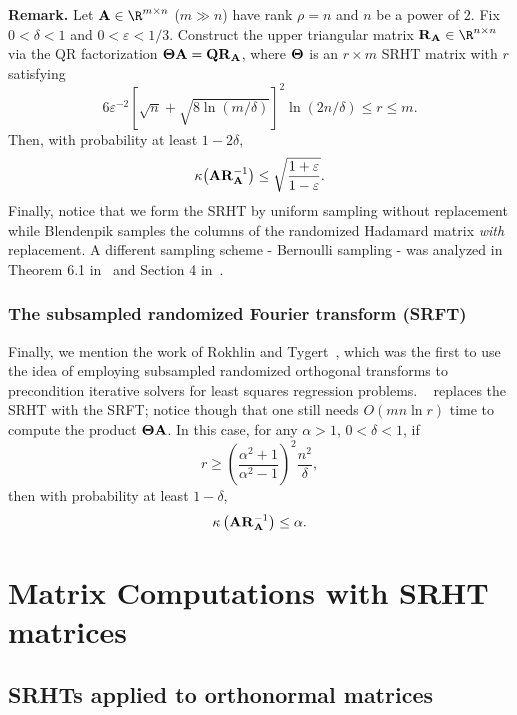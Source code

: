 { \bf Remark.}
Let $\matA \in \R^{m \times n}$ ($m \gg n$) have rank $\rho=n$ and $n$ be a power of $2$. Fix $0 < \delta < 1$ and $0 < \varepsilon < 1/3$.
Construct the upper triangular matrix $\matR_{\matA} \in \R^{n \times n}$ via the QR factorization ${\bm{\mathrm{\Theta}}} {\bm{\mathrm{A}}} = {\bm{\mathrm{Q}}} {\bm{\mathrm{R}}}_{{\bm{\mathrm{A}}}}$,
where ${\bm{\mathrm{\Theta}}}$ is an $r \times m$ SRHT matrix with
$r$ satisfying
\[
 6 \varepsilon^{-2} \left[\sqrt{n} + \sqrt{8\ln(m/\delta)} \right]^2 \ln(2n/\delta) \leq r \leq m.
\]
Then, with probability at least $1 -  2 \delta$,
$$\kappa{ \left( {\ensuremath{\bm{\mathrm{A}}}}{\ensuremath{\bm{\mathrm{R}}}}_{{\ensuremath{\bm{\mathrm{A}}}}}^{-1} \right) } \le \sqrt{ {1 +\varepsilon\over 1 - \varepsilon}}.$$
Finally, notice that we form the SRHT by uniform sampling without replacement while Blendenpik samples the columns of the randomized Hadamard matrix \emph{with} replacement.
A different sampling scheme - Bernoulli sampling - was analyzed in Theorem 6.1 in~\cite{TailBounds} and Section 4 in~\cite{IW12}.

\subsubsection{The subsampled randomized Fourier transform (SRFT)} Finally, we mention the work of Rokhlin and Tygert~\cite{RT08}, which was the first to use
the idea of employing subsampled randomized orthogonal transforms to precondition iterative solvers for least squares regression problems.
~\cite{RT08} replaces the SRHT with the SRFT; notice though that one still needs $O\left( m n \ln r \right)$ time to compute the product ${\bm{\mathrm{\Theta}}} {\bm{\mathrm{A}}}$.
In this case, for any $\alpha > 1$, $0 < \delta < 1$, if
$$r \ge \left( \frac{\alpha^2+1}{\alpha^2-1} \right)^2  \frac{n^2}{\delta},$$
then with probability at least $1 - \delta$,
$$ \kappa\left( {\bm{\mathrm{A}}} {\bm{\mathrm{R}}}_{{\bm{\mathrm{A}}}}^{-1}\right) \le \alpha.$$




\section{Matrix Computations with SRHT matrices}
\label{sec:SRHT}

\subsection{SRHTs applied to orthonormal matrices}
\label{sec:SRHT-orthonormal}

